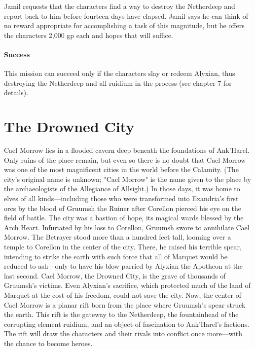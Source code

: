 \documentclass[a4paper, 11pt, bg=full, twocolumn, nooutline]{dndbook}
\begin{document}
Jamil requests that the characters find a way to destroy the Netherdeep and report back to him before fourteen days have elapsed. Jamil says he can think of no reward appropriate for accomplishing a task of this magnitude, but he offers the characters 2,000 gp each and hopes that will suffice.

\subsubsection{Success}

This mission can succeed only if the characters slay or redeem Alyxian, thus destroying the Netherdeep and all ruidium in the process (see chapter 7 for details).

\chapter{The Drowned City}\label{ch:the-drowned-city-6-6}

Cael Morrow lies in a flooded cavern deep beneath the foundations of Ank'Harel. Only ruins of the place remain, but even so there is no doubt that Cael Morrow was one of the most magnificent cities in the world before the Calamity. (The city's original name is unknown; "Cael Morrow" is the name given to the place by the archaeologists of the Allegiance of Allsight.) In those days, it was home to elves of all kinds---including those who were transformed into Exandria's first orcs by the blood of Gruumsh the Ruiner after Corellon pierced his eye on the field of battle. The city was a bastion of hope, its magical wards blessed by the Arch Heart.
Infuriated by his loss to Corellon, Gruumsh swore to annihilate Cael Morrow. The Betrayer stood more than a hundred feet tall, looming over a temple to Corellon in the center of the city. There, he raised his terrible spear, intending to strike the earth with such force that all of Marquet would be reduced to ash---only to have his blow parried by Alyxian the Apotheon at the last second.
Cael Morrow, the Drowned City, is the grave of thousands of Gruumsh's victims. Even Alyxian's sacrifice, which protected much of the land of Marquet at the cost of his freedom, could not save the city. Now, the center of Cael Morrow is a planar rift born from the place where Gruumsh's spear struck the earth. This rift is the gateway to the Netherdeep, the fountainhead of the corrupting element ruidium, and an object of fascination to Ank'Harel's factions. The rift will draw the characters and their rivals into conflict once more---with the chance to become heroes.
\end{document}
